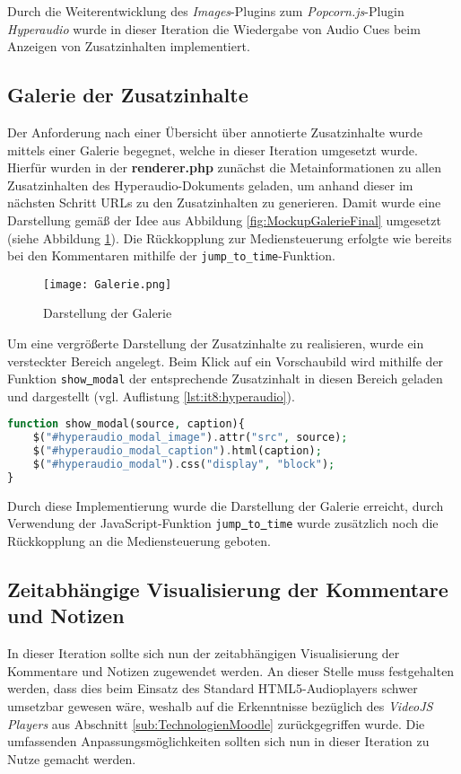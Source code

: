 Durch die Weiterentwicklung des \textit{Images}-Plugins zum \textit{Popcorn.js}-Plugin \textit{Hyperaudio} wurde in dieser Iteration die Wiedergabe von Audio Cues beim Anzeigen von Zusatzinhalten implementiert.

\subsection{Galerie der Zusatzinhalte}
Der Anforderung nach einer Übersicht über annotierte Zusatzinhalte wurde mittels einer Galerie begegnet, welche in dieser Iteration umgesetzt wurde. Hierfür wurden in der \textbf{renderer.php} zunächst die Metainformationen zu allen Zusatzinhalten des Hyperaudio-Dokuments geladen, um anhand dieser im nächsten Schritt URLs zu den Zusatzinhalten zu generieren. Damit wurde eine Darstellung gemäß der Idee aus Abbildung \ref{fig:MockupGalerieFinal} umgesetzt (siehe Abbildung \ref{fig:Galerie}). Die Rückkopplung zur Mediensteuerung erfolgte wie bereits bei den Kommentaren mithilfe der \texttt{jump_to_time}-Funktion.

\begin{figure}[h!]
\texttt{[image: Galerie.png]}
\caption{\label{fig:Galerie}Darstellung der Galerie}
\end{figure}


Um eine vergrößerte Darstellung der Zusatzinhalte zu realisieren, wurde ein versteckter Bereich angelegt. Beim Klick auf ein Vorschaubild wird mithilfe der Funktion \texttt{show\underline{{ }}modal} der entsprechende Zusatzinhalt in diesen Bereich geladen und dargestellt (vgl. Auflistung \ref{lst:it8:hyperaudio}). 

\begin{lstlisting}[language=php,
             linewidth=\textwidth,
             caption={Ausschnitt der \textbf{hyperaudio.js} in der 8. Iteration},
             label={lst:it8:hyperaudio}]
function show_modal(source, caption){
    $("#hyperaudio_modal_image").attr("src", source);
    $("#hyperaudio_modal_caption").html(caption);
    $("#hyperaudio_modal").css("display", "block");
}
\end{lstlisting}

Durch diese Implementierung wurde die Darstellung der Galerie erreicht, durch Verwendung der JavaScript-Funktion \texttt{jump\underline{{ }}to\underline{{ }}time} wurde zusätzlich noch die Rückkopplung an die Mediensteuerung geboten. 

\subsection{Zeitabhängige Visualisierung der Kommentare und Notizen}
In dieser Iteration sollte sich nun der zeitabhängigen Visualisierung der Kommentare und Notizen zugewendet werden. An dieser Stelle muss festgehalten werden, dass dies beim Einsatz des Standard HTML5-Audioplayers schwer umsetzbar gewesen wäre, weshalb auf die Erkenntnisse bezüglich des \textit{VideoJS Players} aus Abschnitt \ref{sub:TechnologienMoodle} zurückgegriffen wurde. Die umfassenden Anpassungsmöglichkeiten sollten sich nun in dieser Iteration zu Nutze gemacht werden.

